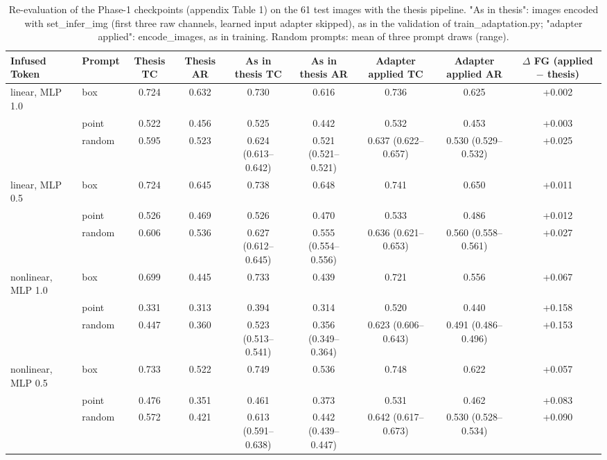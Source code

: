 \begin{table}[htbp]
\centering
\small
\begin{adjustbox}{max width=\linewidth}
\begin{tabular}{llccccccc}
\toprule
Infused Token & Prompt & Thesis TC & Thesis AR & As in thesis TC & As in thesis AR & Adapter applied TC & Adapter applied AR & $\Delta$ FG (applied $-$ thesis) \\
\midrule
linear, MLP 1.0 & box & 0.724 & 0.632 & 0.730 & 0.616 & 0.736 & 0.625 & +0.002 \\
 & point & 0.522 & 0.456 & 0.525 & 0.442 & 0.532 & 0.453 & +0.003 \\
 & random & 0.595 & 0.523 & 0.624 (0.613--0.642) & 0.521 (0.521--0.521) & 0.637 (0.622--0.657) & 0.530 (0.529--0.532) & +0.025 \\
\midrule
linear, MLP 0.5 & box & 0.724 & 0.645 & 0.738 & 0.648 & 0.741 & 0.650 & +0.011 \\
 & point & 0.526 & 0.469 & 0.526 & 0.470 & 0.533 & 0.486 & +0.012 \\
 & random & 0.606 & 0.536 & 0.627 (0.612--0.645) & 0.555 (0.554--0.556) & 0.636 (0.621--0.653) & 0.560 (0.558--0.561) & +0.027 \\
\midrule
nonlinear, MLP 1.0 & box & 0.699 & 0.445 & 0.733 & 0.439 & 0.721 & 0.556 & +0.067 \\
 & point & 0.331 & 0.313 & 0.394 & 0.314 & 0.520 & 0.440 & +0.158 \\
 & random & 0.447 & 0.360 & 0.523 (0.513--0.541) & 0.356 (0.349--0.364) & 0.623 (0.606--0.643) & 0.491 (0.486--0.496) & +0.153 \\
\midrule
nonlinear, MLP 0.5 & box & 0.733 & 0.522 & 0.749 & 0.536 & 0.748 & 0.622 & +0.057 \\
 & point & 0.476 & 0.351 & 0.461 & 0.373 & 0.531 & 0.462 & +0.083 \\
 & random & 0.572 & 0.421 & 0.613 (0.591--0.638) & 0.442 (0.439--0.447) & 0.642 (0.617--0.673) & 0.530 (0.528--0.534) & +0.090 \\
\bottomrule
\end{tabular}
\end{adjustbox}
\caption{Re-evaluation of the Phase-1 checkpoints (appendix Table 1) on the 61 test images with the thesis pipeline. "As in thesis": images encoded with set\_infer\_img (first three raw channels, learned input adapter skipped), as in the validation of train\_adaptation.py; "adapter applied": encode\_images, as in training. Random prompts: mean of three prompt draws (range).}
\label{tab:thesis_recheck_phase1}
\end{table}
